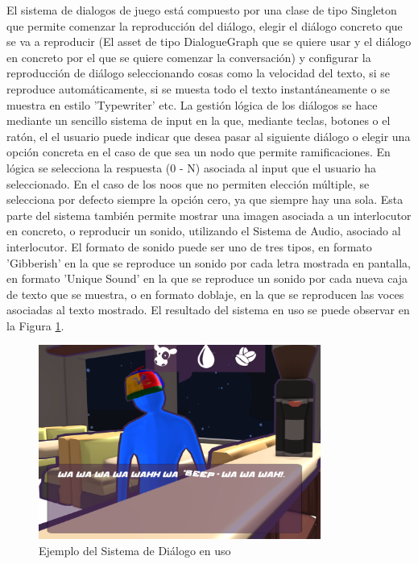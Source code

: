 El sistema de dialogos de juego está compuesto por una clase de tipo Singleton que permite comenzar la reproducción del diálogo, elegir el diálogo concreto que se va a reproducir (El asset de tipo DialogueGraph que 
se quiere usar y el diálogo en concreto por el que se quiere comenzar la conversación) y configurar la reproducción de diálogo seleccionando cosas como la velocidad del texto, si se reproduce automáticamente, si se 
muesta todo el texto instantáneamente o se muestra en estilo 'Typewriter' etc. La gestión lógica de los diálogos se hace mediante un sencillo sistema de input en la que, mediante teclas, botones o el ratón, el el usuario
puede indicar que desea pasar al siguiente diálogo o elegir una opción concreta en el caso de que sea un nodo que permite ramificaciones. En lógica se selecciona la respuesta (0 - N) asociada al input que el usuario ha 
seleccionado. En el caso de los noos que no permiten elección múltiple, se selecciona por defecto siempre la opción cero, ya que siempre hay una sola. Esta parte del sistema también permite mostrar una imagen asociada 
a un interlocutor en concreto, o reproducir un sonido, utilizando el Sistema de Audio, asociado al interlocutor. El formato de sonido puede ser uno de tres tipos, en formato 'Gibberish' en la que se reproduce un 
sonido por cada letra mostrada en pantalla, en formato 'Unique Sound' en la que se reproduce un sonido por cada nueva caja de texto que se muestra, o en formato doblaje, en la que se reproducen las voces asociadas 
al texto mostrado. El resultado del sistema en uso se puede observar en la Figura \ref{fig:dialogueExample}.

\begin{figure}[H]
  \centering
    \includegraphics[width=350px,clip=true]{dialogueExample.png}
  \caption{Ejemplo del Sistema de Diálogo en uso}
  \label{fig:dialogueExample}
\end{figure}

